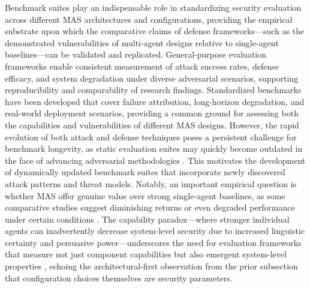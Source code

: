 \documentclass[11pt]{article}
\begin{document}
Benchmark suites play an indispensable role in standardizing security evaluation across different MAS architectures and configurations, providing the empirical substrate upon which the comparative claims of defense frameworks---such as the demonstrated vulnerabilities of multi-agent designs relative to single-agent baselines---can be validated and replicated. General-purpose evaluation frameworks enable consistent measurement of attack success rates, defense efficacy, and system degradation under diverse adversarial scenarios, supporting reproducibility and comparability of research findings. Standardized benchmarks have been developed that cover failure attribution, long-horizon degradation, and real-world deployment scenarios, providing a common ground for assessing both the capabilities and vulnerabilities of different MAS designs. However, the rapid evolution of both attack and defense techniques poses a persistent challenge for benchmark longevity, as static evaluation suites may quickly become outdated in the face of advancing adversarial methodologies \cite{ref447}. This motivates the development of dynamically updated benchmark suites that incorporate newly discovered attack patterns and threat models. Notably, an important empirical question is whether MAS offer genuine value over strong single-agent baselines, as some comparative studies suggest diminishing returns or even degraded performance under certain conditions \cite{ref448}. The capability paradox---where stronger individual agents can inadvertently decrease system-level security due to increased linguistic certainty and persuasive power---underscores the need for evaluation frameworks that measure not just component capabilities but also emergent system-level properties \cite{ref448}, echoing the architectural-first observation from the prior subsection that configuration choices themselves are security parameters.
\end{document}

